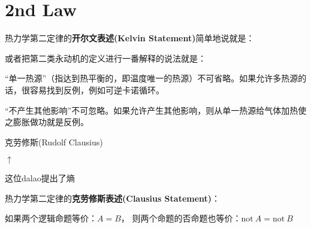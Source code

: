 \documentclass[CJK]{beamer}
\begin{document}
\section{2nd Law}

\begin{frame}
\bch
热力学第二定律的{\bf 开尔文表述(Kelvin Statement)}简单地说就是：

或者把第二类永动机的定义进行一番解释的说法就是：
\ech
\end{frame}

\begin{frame}
\bch
\bitem
\item{“单一热源”（指达到热平衡的，即温度唯一的热源）不可省略。如果允许多热源的话，很容易找到反例，例如可逆卡诺循环。}
\item{“不产生其他影响”不可忽略。如果允许产生其他影响，则从单一热源给气体加热使之膨胀做功就是反例。}
\eitem

\ech
\end{frame}

\begin{frame}
\bch

\bcenter
克劳修斯(Rudolf Clausius)
\ecenter


\bcenter
$\uparrow$

这位dalao提出了熵
\ecenter
\ech
\end{frame}

\begin{frame}
\bch
热力学第二定律的{\bf 克劳修斯表述(Clausius Statement)}：
\ech
\end{frame}

\begin{frame}
\bch
如果两个逻辑命题等价：$A=B$， 则两个命题的否命题也等价：$\mathrm{not}\ A = \mathrm{not}\ B$
\ech
\end{frame}
\end{document}
